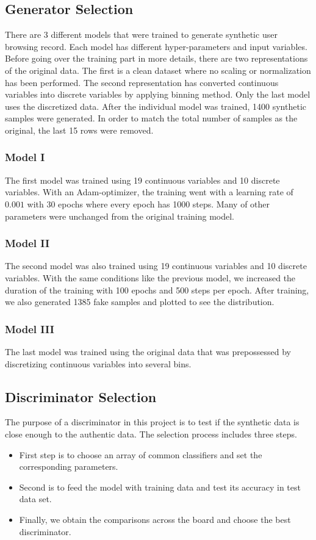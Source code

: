 \documentclass[conference]{IEEEtran}
\begin{document}
\subsection{Generator Selection}
There are 3 different models that were trained to generate synthetic user browsing record. Each model has different hyper-parameters and input variables. Before going over the training part in more details, there are two representations of the original data. The first is a clean dataset where no scaling or normalization has been performed. The second representation has converted continuous variables into discrete variables by applying binning method. Only the last model uses the discretized data. After the individual model was trained, 1400 synthetic samples were generated. In order to match the total number of samples as the original, the last 15 rows were removed.

\subsubsection{Model I}
The first model was trained using 19 continuous variables and 10 discrete variables. With an Adam-optimizer, the training went with a learning rate of $0.001$ with 30 epochs where every epoch has 1000 steps. Many of other parameters were unchanged from the original training model.

\subsubsection{Model II}
The second model was also trained using 19 continuous variables and 10 discrete variables. With the same conditions like the previous model, we increased the duration of the training with 100 epochs and 500 steps per epoch. After training, we also generated 1385 fake samples and plotted to see the distribution. 

\subsubsection{Model III}
The last model was trained using the original data that was prepossessed by discretizing continuous variables into several bins.

\subsection{Discriminator Selection}
The purpose of a discriminator in this project is to test if the synthetic data is close enough to the authentic data. 
The selection process includes three steps. 
\begin{itemize}
\item First step is to choose an array of common classifiers and set the corresponding parameters. 
\item Second is to feed the model with training data and test its accuracy in test data set. 
\item Finally, we obtain the comparisons across the board and choose the best discriminator. 
\end{itemize}
\end{document}

